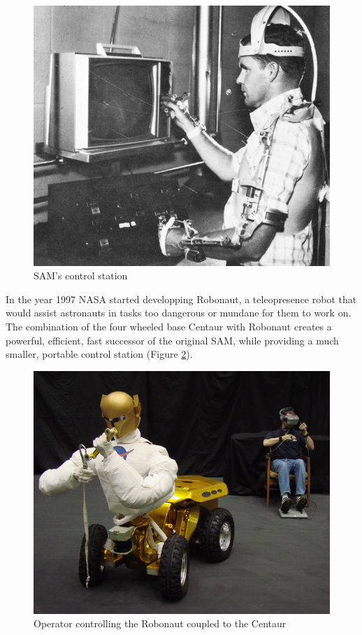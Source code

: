 	\begin{figure}[H]
			\centering
			\includegraphics[scale=2]{images/StateOfArt/SAM2.jpg}
			\caption{SAM's control station }
			\label{sam2}
	\end{figure}
	
In the year 1997 NASA started developping Robonaut, a teleopresence robot that would assist astronauts in tasks too dangerous or mundane for them to work on. The combination of the four wheeled base Centaur with Robonaut creates a powerful, efficient, fast successor of the original SAM, while providing a much smaller, portable control station (Figure \ref{robonaut}).

	\begin{figure}[H]
			\centering
			\includegraphics[scale=0.55]{images/StateOfArt/robonaut.jpg}
			\caption{Operator controlling the Robonaut coupled to the Centaur}
			\label{robonaut}
	\end{figure}
	\bigskip 

